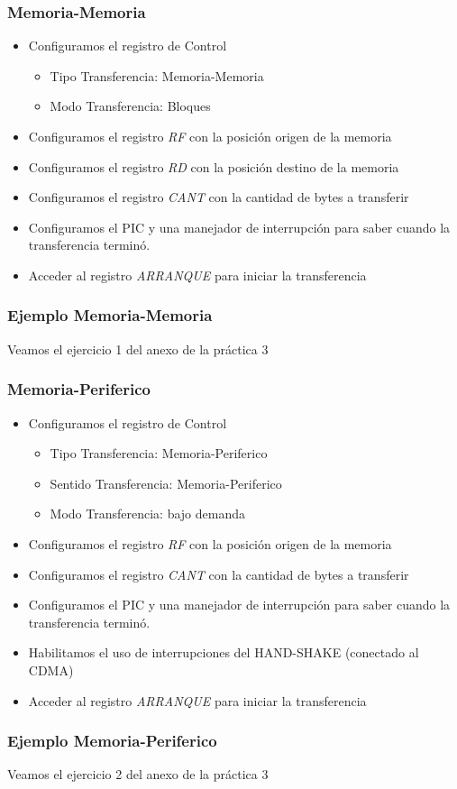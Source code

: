 \documentclass{beamer}
\begin{document}
\begin{frame}
\frametitle{Memoria-Memoria}
  \begin{itemize}
     \item Configuramos el registro de Control
     \begin{itemize}
	\item Tipo Transferencia: Memoria-Memoria
        \item Modo Transferencia: Bloques
     \end{itemize}
     \item Configuramos el registro \emph{RF} con la posición origen de la memoria
     \item Configuramos el registro \emph{RD} con la posición destino de la memoria
     \item Configuramos el registro \emph{CANT} con la cantidad de bytes a transferir
     \item Configuramos el PIC y una manejador de interrupción para saber cuando la transferencia terminó.
     \item Acceder al registro \emph{ARRANQUE} para iniciar la transferencia
  \end{itemize}
\end{frame}

\begin{frame}
\frametitle{Ejemplo Memoria-Memoria}
Veamos el ejercicio 1 del anexo de la práctica 3
\end{frame}

\begin{frame}
\frametitle{Memoria-Periferico}
  \begin{itemize}
     \item Configuramos el registro de Control
     \begin{itemize}
	\item Tipo Transferencia: Memoria-Periferico
        \item Sentido Transferencia: Memoria-Periferico
        \item Modo Transferencia: bajo demanda
     \end{itemize}
     \item Configuramos el registro \emph{RF} con la posición origen de la memoria
     \item Configuramos el registro \emph{CANT} con la cantidad de bytes a transferir
     \item Configuramos el PIC y una manejador de interrupción para saber cuando la transferencia terminó.
     \item Habilitamos el uso de interrupciones del HAND-SHAKE (conectado al CDMA)
     \item Acceder al registro \emph{ARRANQUE} para iniciar la transferencia
  \end{itemize}
\end{frame}

\begin{frame}
\frametitle{Ejemplo Memoria-Periferico}
Veamos el ejercicio 2 del anexo de la práctica 3
\end{frame}
\end{document}
